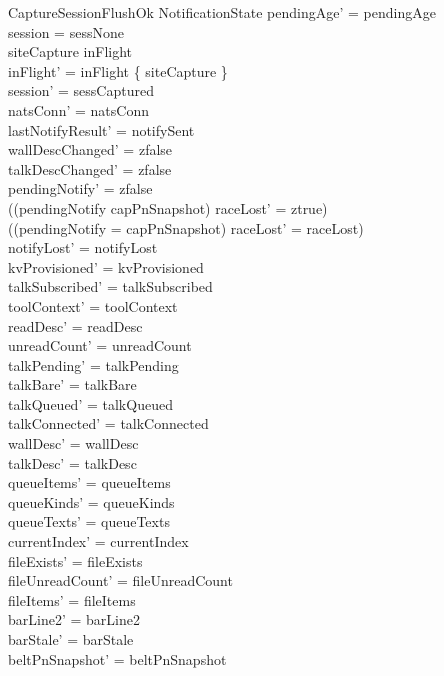 \documentclass[a4paper,10pt,fleqn]{article}
\begin{document}
\begin{schema}{CaptureSessionFlushOk}
  \Delta NotificationState
  \where
  pendingAge' = pendingAge \\
  session = sessNone \\
  siteCapture \in inFlight \\
  inFlight' = inFlight \setminus \{ siteCapture \} \\
  session' = sessCaptured \\
  natsConn' = natsConn \\
  lastNotifyResult' = notifySent \\
  wallDescChanged' = zfalse \\
  talkDescChanged' = zfalse \\
  pendingNotify' = zfalse \\
  ((pendingNotify \neq capPnSnapshot) \implies raceLost' = ztrue) \\
  ((pendingNotify = capPnSnapshot) \implies raceLost' = raceLost) \\
  notifyLost' = notifyLost \\
  kvProvisioned' = kvProvisioned \\
  talkSubscribed' = talkSubscribed \\
  toolContext' = toolContext \\
  readDesc' = readDesc \\
  unreadCount' = unreadCount \\
  talkPending' = talkPending \\
  talkBare' = talkBare \\
  talkQueued' = talkQueued \\
  talkConnected' = talkConnected \\
  wallDesc' = wallDesc \\
  talkDesc' = talkDesc \\
  queueItems' = queueItems \\
  queueKinds' = queueKinds \\
  queueTexts' = queueTexts \\
  currentIndex' = currentIndex \\
  fileExists' = fileExists \\
  fileUnreadCount' = fileUnreadCount \\
  fileItems' = fileItems \\
  barLine2' = barLine2 \\
  barStale' = barStale \\
  beltPnSnapshot' = beltPnSnapshot \\

\end{schema}
\end{document}
